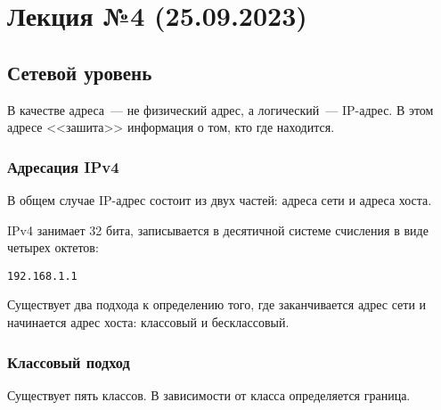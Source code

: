 \section{Лекция №4 (25.09.2023)}


\subsection{Сетевой уровень}

В качестве адреса~--- не физический адрес, а логический~--- IP-адрес. В этом адресе <<зашита>> информация о том, кто где находится.

\subsubsection{Адресация IPv4}

В общем случае IP-адрес состоит из двух частей: адреса сети и адреса хоста.

IPv4 занимает 32 бита, записывается в десятичной системе счисления в виде
четырех октетов:
%
\begin{center}
    \texttt{192.168.1.1}
\end{center}
%
Существует два подхода к определению того, где заканчивается адрес сети и начинается адрес хоста: классовый и бесклассовый.

\subsubsection{Классовый подход}

Существует пять классов. В зависимости от класса определяется граница.


